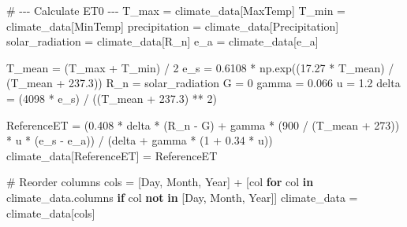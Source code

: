 \documentclass[
  letterpaper,
  DIV=11,
  numbers=noendperiod]{scrartcl}
\newenvironment{Shaded}{\begin{snugshade}}{\end{snugshade}}
\newcommand{\CommentTok}[1]{\textcolor[rgb]{0.37,0.37,0.37}{#1}}
\newcommand{\ControlFlowTok}[1]{\textcolor[rgb]{0.00,0.23,0.31}{\textbf{#1}}}
\newcommand{\DecValTok}[1]{\textcolor[rgb]{0.68,0.00,0.00}{#1}}
\newcommand{\FloatTok}[1]{\textcolor[rgb]{0.68,0.00,0.00}{#1}}
\newcommand{\KeywordTok}[1]{\textcolor[rgb]{0.00,0.23,0.31}{\textbf{#1}}}
\newcommand{\NormalTok}[1]{\textcolor[rgb]{0.00,0.23,0.31}{#1}}
\newcommand{\OperatorTok}[1]{\textcolor[rgb]{0.37,0.37,0.37}{#1}}
\newcommand{\StringTok}[1]{\textcolor[rgb]{0.13,0.47,0.30}{#1}}
\begin{document}
\begin{Shaded}
\begin{Highlighting}[]
    \CommentTok{\# {-}{-}{-} Calculate ET0 {-}{-}{-}}
\NormalTok{    T\_max }\OperatorTok{=}\NormalTok{ climate\_data[}\StringTok{\textquotesingle{}MaxTemp\textquotesingle{}}\NormalTok{]}
\NormalTok{    T\_min }\OperatorTok{=}\NormalTok{ climate\_data[}\StringTok{\textquotesingle{}MinTemp\textquotesingle{}}\NormalTok{]}
\NormalTok{    precipitation }\OperatorTok{=}\NormalTok{ climate\_data[}\StringTok{\textquotesingle{}Precipitation\textquotesingle{}}\NormalTok{]}
\NormalTok{    solar\_radiation }\OperatorTok{=}\NormalTok{ climate\_data[}\StringTok{\textquotesingle{}R\_n\textquotesingle{}}\NormalTok{]}
\NormalTok{    e\_a }\OperatorTok{=}\NormalTok{ climate\_data[}\StringTok{\textquotesingle{}e\_a\textquotesingle{}}\NormalTok{]}

\NormalTok{    T\_mean }\OperatorTok{=}\NormalTok{ (T\_max }\OperatorTok{+}\NormalTok{ T\_min) }\OperatorTok{/} \DecValTok{2}
\NormalTok{    e\_s }\OperatorTok{=} \FloatTok{0.6108} \OperatorTok{*}\NormalTok{ np.exp((}\FloatTok{17.27} \OperatorTok{*}\NormalTok{ T\_mean) }\OperatorTok{/}\NormalTok{ (T\_mean }\OperatorTok{+} \FloatTok{237.3}\NormalTok{))}
\NormalTok{    R\_n }\OperatorTok{=}\NormalTok{ solar\_radiation}
\NormalTok{    G }\OperatorTok{=} \DecValTok{0}
\NormalTok{    gamma }\OperatorTok{=} \FloatTok{0.066}
\NormalTok{    u }\OperatorTok{=} \FloatTok{1.2}
\NormalTok{    delta }\OperatorTok{=}\NormalTok{ (}\DecValTok{4098} \OperatorTok{*}\NormalTok{ e\_s) }\OperatorTok{/}\NormalTok{ ((T\_mean }\OperatorTok{+} \FloatTok{237.3}\NormalTok{) }\OperatorTok{**} \DecValTok{2}\NormalTok{)}

\NormalTok{    ReferenceET }\OperatorTok{=}\NormalTok{ (}\FloatTok{0.408} \OperatorTok{*}\NormalTok{ delta }\OperatorTok{*}\NormalTok{ (R\_n }\OperatorTok{{-}}\NormalTok{ G) }\OperatorTok{+}\NormalTok{ gamma }\OperatorTok{*}\NormalTok{ (}\DecValTok{900} \OperatorTok{/}\NormalTok{ (T\_mean }\OperatorTok{+} \DecValTok{273}\NormalTok{)) }\OperatorTok{*}\NormalTok{ u }\OperatorTok{*}\NormalTok{ (e\_s }\OperatorTok{{-}}\NormalTok{ e\_a)) }\OperatorTok{/}\NormalTok{ (delta }\OperatorTok{+}\NormalTok{ gamma }\OperatorTok{*}\NormalTok{ (}\DecValTok{1} \OperatorTok{+} \FloatTok{0.34} \OperatorTok{*}\NormalTok{ u))}
\NormalTok{    climate\_data[}\StringTok{\textquotesingle{}ReferenceET\textquotesingle{}}\NormalTok{] }\OperatorTok{=}\NormalTok{ ReferenceET}

    \CommentTok{\# Reorder columns}
\NormalTok{    cols }\OperatorTok{=}\NormalTok{ [}\StringTok{\textquotesingle{}Day\textquotesingle{}}\NormalTok{, }\StringTok{\textquotesingle{}Month\textquotesingle{}}\NormalTok{, }\StringTok{\textquotesingle{}Year\textquotesingle{}}\NormalTok{] }\OperatorTok{+}\NormalTok{ [col }\ControlFlowTok{for}\NormalTok{ col }\KeywordTok{in}\NormalTok{ climate\_data.columns }\ControlFlowTok{if}\NormalTok{ col }\KeywordTok{not} \KeywordTok{in}\NormalTok{ [}\StringTok{\textquotesingle{}Day\textquotesingle{}}\NormalTok{, }\StringTok{\textquotesingle{}Month\textquotesingle{}}\NormalTok{, }\StringTok{\textquotesingle{}Year\textquotesingle{}}\NormalTok{]]}
\NormalTok{    climate\_data }\OperatorTok{=}\NormalTok{ climate\_data[cols]}


\end{Highlighting}
\end{Shaded}
\end{document}
